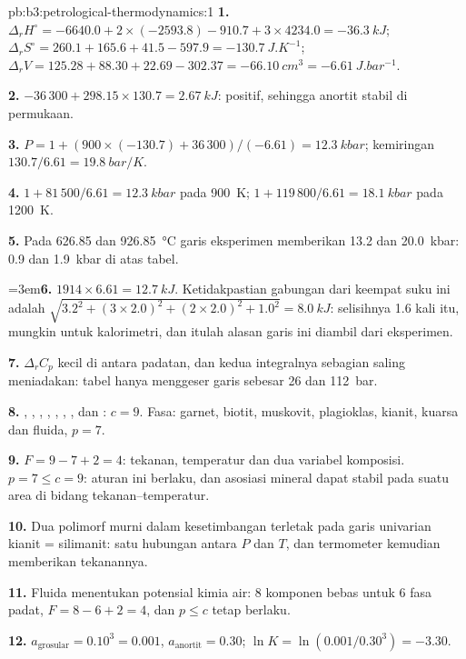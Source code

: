 \begin{solution}{pb:b3:petrological-thermodynamics:1}
\textbf{1.} $\Delta_rH^\circ = -6640.0 + 2\times(-2593.8) - 910.7 + 3\times4234.0
= \qty{-36.3}{kJ}$; $\Delta_rS^\circ = 260.1 + 165.6 + 41.5 - 597.9 =
\qty{-130.7}{J.K^{-1}}$; $\Delta_rV = 125.28 + 88.30 + 22.69 - 302.37 =
\qty{-66.10}{cm^3} = \qty{-6.61}{J.bar^{-1}}$.

\textbf{2.} $-36\,300 + 298.15\times130.7 = \qty{+2.67}{kJ}$: positif, sehingga
anortit stabil di permukaan.

\textbf{3.} $P = 1 + (900\times(-130.7) + 36\,300)/(-6.61) = \qty{12.3}{kbar}$;
kemiringan $130.7/6.61 = \qty{19.8}{bar/K}$.

\textbf{4.} $1 + 81\,500/6.61 = \qty{12.3}{kbar}$ pada \qty{900}{K}; $1 +
119\,800/6.61 = \qty{18.1}{kbar}$ pada \qty{1200}{K}.

\textbf{5.} Pada 626.85 dan \qty{926.85}{\celsius} garis eksperimen memberikan
13.2 dan \qty{20.0}{kbar}: 0.9 dan \qty{1.9}{kbar} di atas tabel.

\begingroup\emergencystretch=3em\relax \textbf{6.} $1914\times6.61 = \qty{12.7}{kJ}$. Ketidakpastian gabungan dari keempat suku ini adalah\linebreak
$\sqrt{3.2^2 + (3\times2.0)^2 + (2\times2.0)^2 + 1.0^2} = \qty{8.0}{kJ}$: selisihnya
1.6 kali itu, mungkin untuk kalorimetri, dan itulah alasan garis ini
diambil dari eksperimen.
\par\endgroup
\textbf{7.} $\Delta_rC_p$ kecil di antara padatan, dan kedua integralnya sebagian
saling meniadakan: tabel hanya menggeser garis sebesar 26 dan \qty{112}{bar}.

\textbf{8.} , , , , , ,
,  dan : $c = 9$. Fasa: garnet, biotit,
muskovit, plagioklas, kianit, kuarsa dan fluida, $p = 7$.

\textbf{9.} $F = 9 - 7 + 2 = 4$: tekanan, temperatur dan dua
variabel komposisi. $p = 7 \le c = 9$: aturan ini berlaku, dan asosiasi mineral dapat stabil
pada suatu area di bidang tekanan--temperatur.

\textbf{10.} Dua polimorf  murni dalam kesetimbangan terletak pada
garis univarian kianit = silimanit: satu hubungan antara $P$ dan $T$, dan
termometer kemudian memberikan tekanannya.

\textbf{11.} Fluida menentukan potensial kimia air: 8 komponen bebas
untuk 6 fasa padat, $F = 8 - 6 + 2 = 4$, dan $p \le c$ tetap
berlaku.

\textbf{12.} $a_{\text{grosular}} = 0.10^3 = 0.001$, $a_{\text{anortit}} =
0.30$; $\ln K = \ln(0.001/0.30^3) = -3.30$.


\end{solution}
